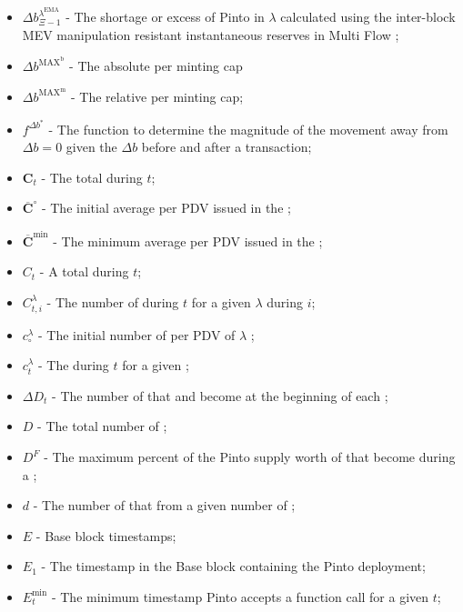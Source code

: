 \documentclass[class=article, crop=false]{standalone}
\begin{document}
\begin{itemize}[topsep=0pt, itemsep=3pt,leftmargin=16pt]
    \item[] $\Delta b_{\Xi-1}^{\lambda^{\text{EMA}}}$ - The shortage or excess of Pinto in $\lambda$ calculated using the inter-block MEV manipulation resistant instantaneous reserves in Multi Flow ;
    \item[] $\Delta b^{\text{MAX}^{\text{b}}}$ - The absolute per  minting cap
    \item[] $\Delta b^{\text{MAX}^{\text{m}}}$ - The relative per  minting cap;
    \item[] $f^{\Delta b^{*}}$ - The function to determine the magnitude of the movement away from $\Delta b = 0$ given the $\Delta b$ before and after a transaction;
    \item[] $\mathbf{C}_{t}$ - The total  during $t$;
    \item[] $\overline{\mathbf{C}}^{\circ}$ - The initial average  per PDV issued in the ;
    \item[] $\overline{\mathbf{C}}^{\text{min}}$ - The minimum average  per PDV issued in the ;
    \item[] $C_{t}$ - A  total  during $t$;
    \item[] $C_{t,i}^{\lambda}$ - The number of  during $t$ for a given $\lambda$   during $i$;
    \item[] $c_{\circ}^{\lambda}$ - The initial number of  per PDV of $\lambda$ ;
    \item[] $c_{t}^{\lambda}$ - The  during $t$ for a given ;
    \item[] $\Delta D_{t}$ - The number of  that  and become  at the beginning of each ;
    \item[] $D$ - The total number of ;
    \item[] $D^{F}$ - The maximum percent of the Pinto supply worth of  that become  during a ;
    \item[] $d$ - The number of  that  from a given number of  \Pinto;
    \item[] $E$ - Base block timestamps;
    \item[] $E_{1}$ - The timestamp in the Base block containing the Pinto deployment;
    \item[] $E_{t}^{\text{min}}$ - The minimum timestamp Pinto accepts a  function call for a given $t$;

\end{itemize}
\end{document}
